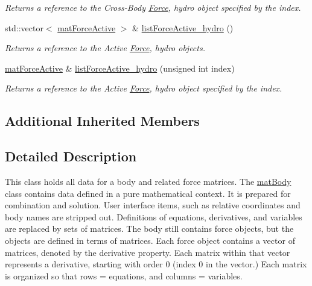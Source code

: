 \begin{DoxyCompactItemize}
\begin{DoxyCompactList}\small\item\em Returns a reference to the Cross-\/\-Body \hyperlink{classosea_1_1ofreq_1_1_force}{Force}, hydro object specified by the index. \end{DoxyCompactList}\item 
std\-::vector$<$ \hyperlink{classosea_1_1ofreq_1_1mat_force_active}{mat\-Force\-Active} $>$ \& \hyperlink{classosea_1_1ofreq_1_1mat_body_a9733e23db05aac47a42cfca88fc9d679}{list\-Force\-Active\-\_\-hydro} ()
\begin{DoxyCompactList}\small\item\em Returns a reference to the Active \hyperlink{classosea_1_1ofreq_1_1_force}{Force}, hydro objects. \end{DoxyCompactList}\item 
\hyperlink{classosea_1_1ofreq_1_1mat_force_active}{mat\-Force\-Active} \& \hyperlink{classosea_1_1ofreq_1_1mat_body_aa1c0587dc82254db28ff71a9cc3261d7}{list\-Force\-Active\-\_\-hydro} (unsigned int index)
\begin{DoxyCompactList}\small\item\em Returns a reference to the Active \hyperlink{classosea_1_1ofreq_1_1_force}{Force}, hydro object specified by the index. \end{DoxyCompactList}\end{DoxyCompactItemize}
\subsection*{Additional Inherited Members}


\subsection{Detailed Description}
This class holds all data for a body and related force matrices. The \hyperlink{classosea_1_1ofreq_1_1mat_body}{mat\-Body} class contains data defined in a pure mathematical context. It is prepared for combination and solution. User interface items, such as relative coordinates and body names are stripped out. Definitions of equations, derivatives, and variables are replaced by sets of matrices. The body still contains force objects, but the objects are defined in terms of matrices. Each force object contains a vector of matrices, denoted by the derivative property. Each matrix within that vector represents a derivative, starting with order 0 (index 0 in the vector.) Each matrix is organized so that rows = equations, and columns = variables.

